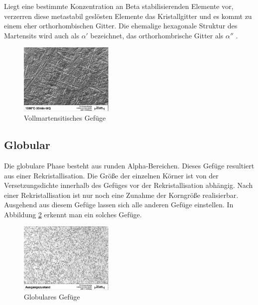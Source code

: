 \documentclass[a4paper, 11pt]{tubsreprt}
\begin{document}
Liegt eine bestimmte Konzentration an Beta stabilisierenden Elemente vor, verzerren diese metastabil geslösten Elemente das Kristallgitter und es kommt zu einem eher orthorhombischen Gitter. Die ehemalige hexagonale Struktur des Martensits wird auch als $\alpha'$ bezeichnet, das orthorhombrische Gitter als $\alpha''$ \cite{Luetjering2007}. 

\begin{figure}
\centering
\includegraphics[width=0.4\textwidth]{Bilder/Vollmartensit.jpg}
\caption{Vollmartensitisches Gefüge}
\label{vollmartensit}
\end{figure}
\subsection{Globular}
Die globulare Phase besteht aus runden Alpha-Bereichen. Dieses Gefüge resultiert aus einer Rekristallisation. Die Größe der einzelnen Körner ist von der Versetzungsdichte innerhalb des Gefüges vor der Rekristallisation abhängig. Nach einer Rekristallisation ist nur noch eine Zunahme der Korngröße realisierbar. Ausgehend aus diesem Gefüge lassen sich alle anderen Gefüge einstellen. In Abbildung \ref{globular} erkennt man ein solches Gefüge. 
\begin{figure} %
\centering
\includegraphics[width=0.4\textwidth]{Bilder/Ausgangsgefuege.jpg}
\caption{Globulares Gefüge}
\label{globular}
\end{figure}
\end{document}

